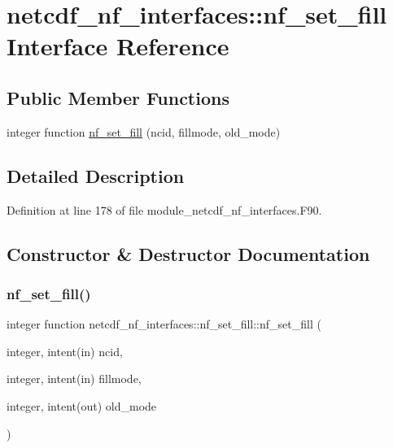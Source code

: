 \hypertarget{interfacenetcdf__nf__interfaces_1_1nf__set__fill}{}\section{netcdf\+\_\+nf\+\_\+interfaces\+:\+:nf\+\_\+set\+\_\+fill Interface Reference}
\label{interfacenetcdf__nf__interfaces_1_1nf__set__fill}
\subsection*{Public Member Functions}
\begin{DoxyCompactItemize}
\item 
integer function \hyperlink{interfacenetcdf__nf__interfaces_1_1nf__set__fill_a8b832a4affb25bf8260ad777168033a7}{nf\+\_\+set\+\_\+fill} (ncid, fillmode, old\+\_\+mode)
\end{DoxyCompactItemize}


\subsection{Detailed Description}


Definition at line 178 of file module\+\_\+netcdf\+\_\+nf\+\_\+interfaces.\+F90.



\subsection{Constructor \& Destructor Documentation}
\mbox{\label{interfacenetcdf__nf__interfaces_1_1nf__set__fill_a8b832a4affb25bf8260ad777168033a7}} 
\subsubsection{\texorpdfstring{nf\+\_\+set\+\_\+fill()}{nf\_set\_fill()}}
{\footnotesize\ttfamily integer function netcdf\+\_\+nf\+\_\+interfaces\+::nf\+\_\+set\+\_\+fill\+::nf\+\_\+set\+\_\+fill (\begin{DoxyParamCaption}\item[{integer, intent(in)}]{ncid,  }\item[{integer, intent(in)}]{fillmode,  }\item[{integer, intent(out)}]{old\+\_\+mode }\end{DoxyParamCaption})}



